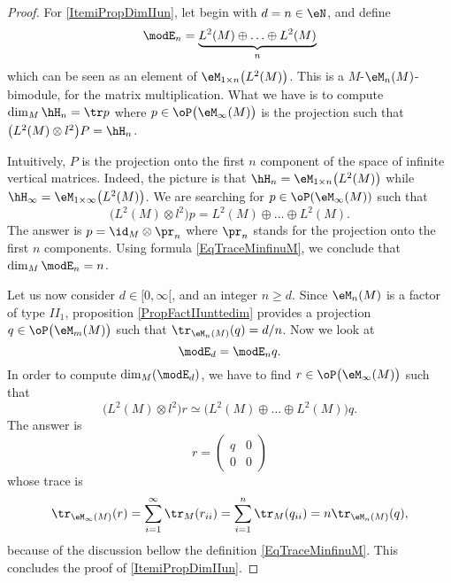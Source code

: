 \begin{proof}

	For \ref{ItemiPropDimIIun}, let begin with $d=n\in \eN$, and define
	\begin{equation}
		\modE_n=\underbrace{  L^2(M)\oplus\ldots\oplus L^2(M)   }_{\text{}n}
	\end{equation}
	which can be seen as an element of $\eM_{1\times n}\big( L^2(M) \big)$. This is a $M$-$\eM_n(M)$-bimodule, for the matrix multiplication. What we have is to compute $\dim_{M}\hH_n=\tr p$ where $p\in\oP\big( \eM_{\infty}(M) \big)$ is the projection such that $\big( L^2(M)\otimes l^2 \big)P=\hH_n$. 
	
	Intuitively, $P$ is the projection onto the first $n$ component of the space of infinite vertical matrices. Indeed, the picture is that $\hH_n=\eM_{1\times n}\big( L^2(M) \big)$ while $\hH_{\infty}=\eM_{1\times \infty}\big( L^2(M) \big)$. We are searching for $p\in\oP(\eM_{\infty}(M))$ such that 
	\begin{equation}
		\big( L^2(M)\otimes l^2 \big)p=L^2(M)\oplus\ldots\oplus L^2(M).
	\end{equation}
	The answer is $p=\id_{M}\otimes \pr_n$ where $\pr_n$ stands for the projection onto the first $n$ components. Using formula \eqref{EqTraceMinfinuM}, we conclude that $\dim_M\modE_n=n$. 

	Let us now consider $d\in[0,\infty[$, and an integer $n\geq d$. Since $\eM_n(M)$ is a factor of type $II_1$, proposition \ref{PropFactIIunttedim} provides a projection $q\in\oP\big( \eM_m(M) \big)$ such that $\tr_{\eM_n(M)}(q)=d/n$. Now we look at
	\begin{equation}
		\modE_d=\modE_nq.
	\end{equation}
	In order to compute $\dim_M(\modE_d)$, we have to find $r\in\oP\big( \eM_{\infty}(M) \big)$ such that
	\begin{equation}
		\big( L^2(M)\otimes l^2 \big)r\simeq \big( L^2(M)\oplus\ldots\oplus L^2(M) \big)q.
	\end{equation}
	The answer is
	\begin{equation}
		r=
	\begin{pmatrix}
	  q	&	0	\\ 
	  0	&	0	
	\end{pmatrix}
	\end{equation}
	whose trace is 
	\begin{equation}
		\tr_{\eM_{\infty}(M)}(r)=\sum_{i=1}^{\infty}\tr_M(r_{ii})=\sum_{i=1}^n\tr_M(q_{ii})=n\tr_{\eM_n(M)}(q),
	\end{equation}
	because of the discussion bellow the definition \eqref{EqTraceMinfinuM}. This concludes the proof of \ref{ItemiPropDimIIun}.
	

\end{proof}

